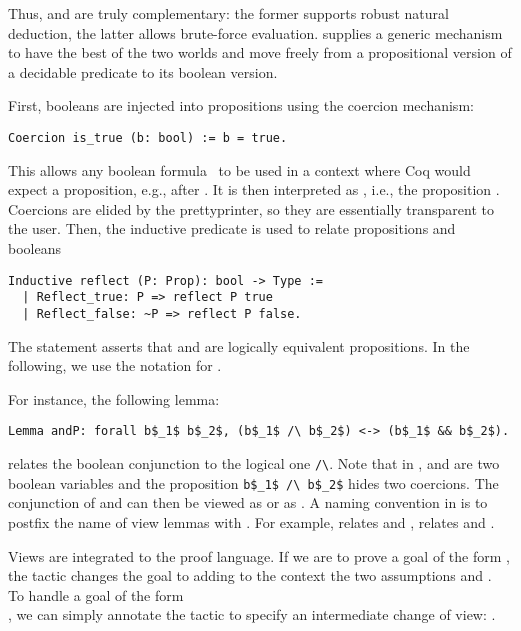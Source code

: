 Thus,  and  are truly complementary: the former supports robust natural deduction, the latter allows brute-force evaluation.
\ssr{} supplies
a generic mechanism to have the best of the two worlds and move freely 
from a propositional version of a
decidable predicate to its boolean version.

First, booleans are injected into propositions 
using the coercion mechanism:
\begin{lstlisting}
Coercion is_true (b: bool) := b = true.
\end{lstlisting}
This allows any boolean formula~ to be used in a context
where {\sc Coq} would expect a proposition, e.g., after .
It is then interpreted as , i.e.,
the  proposition . Coercions are elided by the prettyprinter,
so they are essentially transparent to the user.
Then, the inductive predicate 
is used to relate propositions and booleans
\begin{lstlisting}
Inductive reflect (P: Prop): bool -> Type :=
  | Reflect_true: P => reflect P true
  | Reflect_false: ~P => reflect P false.
\end{lstlisting}
The statement  asserts that 
and  are logically equivalent propositions. In the following, we use
the notation  for .

For instance, the following lemma:
\begin{lstlisting}
Lemma andP: forall b$_1$ b$_2$, (b$_1$ /\ b$_2$) <-> (b$_1$ && b$_2$).
\end{lstlisting}
relates the boolean conjunction \C{\&\&} to
the logical one \lstinline[basicstyle=\footnotesize]+/\+. 
Note that in ,  and  are two boolean variables and
the proposition \lstinline[basicstyle=\footnotesize]+b$_1$ /\ b$_2$+ hides two coercions.
The conjunction of  and  can then be viewed
as   or as . 
A naming convention in \ssr{} is to postfix the name of view lemmas with .
For example,  relates  \C{\|\|} and \C{\\/},  relates   and \C{\~}.

Views are integrated to the proof language.
If we are to prove a goal of the form ,
the tactic  changes the goal to 
adding to the context the two assumptions
 and .
To handle a goal of the form \\ , we can simply annotate the tactic to specify an intermediate change of view: .

